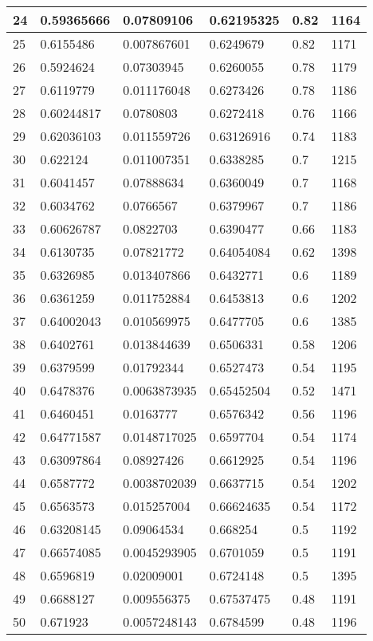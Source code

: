 \begin{longtable}{|l|l|l|l|l|l|}
24 & 0.59365666 & 0.07809106 & 0.62195325 & 0.82 & 1164 \\ \hline 
25 & 0.6155486 & 0.007867601 & 0.6249679 & 0.82 & 1171 \\ \hline 
26 & 0.5924624 & 0.07303945 & 0.6260055 & 0.78 & 1179 \\ \hline 
27 & 0.6119779 & 0.011176048 & 0.6273426 & 0.78 & 1186 \\ \hline 
28 & 0.60244817 & 0.0780803 & 0.6272418 & 0.76 & 1166 \\ \hline 
29 & 0.62036103 & 0.011559726 & 0.63126916 & 0.74 & 1183 \\ \hline 
30 & 0.622124 & 0.011007351 & 0.6338285 & 0.7 & 1215 \\ \hline 
31 & 0.6041457 & 0.07888634 & 0.6360049 & 0.7 & 1168 \\ \hline 
32 & 0.6034762 & 0.0766567 & 0.6379967 & 0.7 & 1186 \\ \hline 
33 & 0.60626787 & 0.0822703 & 0.6390477 & 0.66 & 1183 \\ \hline 
34 & 0.6130735 & 0.07821772 & 0.64054084 & 0.62 & 1398 \\ \hline 
35 & 0.6326985 & 0.013407866 & 0.6432771 & 0.6 & 1189 \\ \hline 
36 & 0.6361259 & 0.011752884 & 0.6453813 & 0.6 & 1202 \\ \hline 
37 & 0.64002043 & 0.010569975 & 0.6477705 & 0.6 & 1385 \\ \hline 
38 & 0.6402761 & 0.013844639 & 0.6506331 & 0.58 & 1206 \\ \hline 
39 & 0.6379599 & 0.01792344 & 0.6527473 & 0.54 & 1195 \\ \hline 
40 & 0.6478376 & 0.0063873935 & 0.65452504 & 0.52 & 1471 \\ \hline 
41 & 0.6460451 & 0.0163777 & 0.6576342 & 0.56 & 1196 \\ \hline 
42 & 0.64771587 & 0.0148717025 & 0.6597704 & 0.54 & 1174 \\ \hline 
43 & 0.63097864 & 0.08927426 & 0.6612925 & 0.54 & 1196 \\ \hline 
44 & 0.6587772 & 0.0038702039 & 0.6637715 & 0.54 & 1202 \\ \hline 
45 & 0.6563573 & 0.015257004 & 0.66624635 & 0.54 & 1172 \\ \hline 
46 & 0.63208145 & 0.09064534 & 0.668254 & 0.5 & 1192 \\ \hline 
47 & 0.66574085 & 0.0045293905 & 0.6701059 & 0.5 & 1191 \\ \hline 
48 & 0.6596819 & 0.02009001 & 0.6724148 & 0.5 & 1395 \\ \hline 
49 & 0.6688127 & 0.009556375 & 0.67537475 & 0.48 & 1191 \\ \hline 
50 & 0.671923 & 0.0057248143 & 0.6784599 & 0.48 & 1196 \\ \hline 
\end{longtable}